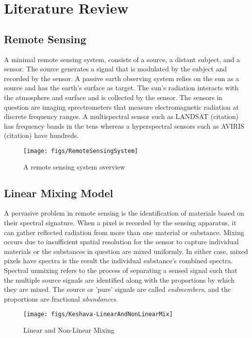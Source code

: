 \chapter{Literature Review}
\section{Remote Sensing}
A minimal remote sensing system, consists of a source, a distant subject, and a sensor.  The source generates a signal that is modulated by the subject and recorded by the sensor.  A passive earth observing system relies on the sun as a source and has the earth's surface as target.  The sun's radiation interacts with the atmosphere and surface and is collected by the sensor.  The sensors in question are imaging sprectrometers that measure electromagnetic radiation at discrete frequency ranges.  A multispectral sensor such as LANDSAT (citation) has frequency bands in the tens whereas a hyperspectral sensors such as AVIRIS (citation) have hundreds.


\begin{figure}[ht]
	\begin{center}
		\texttt{[image: figs/RemoteSensingSystem]}
		\caption{A remote sensing system overview \cite{landgrebe_signal_2003}}
		\label{fig:RemoteSensingSystem}
	\end{center}
\end{figure}

\section{Linear Mixing Model}
A pervasive problem in remote sensing is the identification of materials based on their spectral signature.  When a pixel is recorded by the sensing apparatus, it can gather reflected radiation from more than one material or substance.  Mixing occurs due to insufficient spatial resolution for the sensor to capture individual materials or the substances in question are mixed uniformly.  In either case, mixed pixels have spectra is the result the individual substance's combined spectra.  Spectral unmixing \cite{keshava_spectral_2002} refers to the process of separating a sensed signal such that the multiple source signals are identified along with the proportions by which they are mixed.  The source or 'pure' signals are called \textit{endmembers}, and the proportions are fractional \textit{abundances}.

\begin{figure}[ht]
	\begin{center}
		\texttt{[image: figs/Keshava-LinearAndNonLinearMix]}
		\caption{Linear and Non-Linear Mixing \cite{keshava_spectral_2002}}
		\label{fig:LinearAndNonLinearMix}
	\end{center}
\end{figure}

